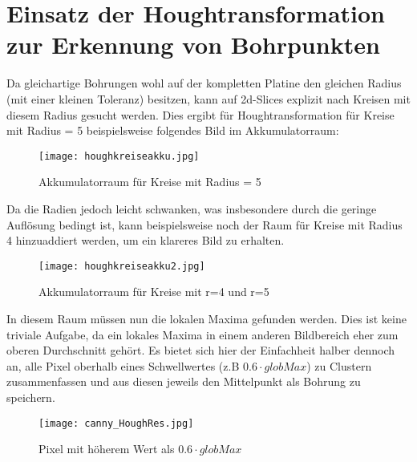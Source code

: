 \section{Einsatz der Houghtransformation zur Erkennung von Bohrpunkten}
Da gleichartige Bohrungen wohl auf der kompletten Platine den gleichen Radius (mit einer kleinen Toleranz) besitzen, kann auf 2d-Slices explizit nach Kreisen mit diesem Radius gesucht werden. Dies ergibt für Houghtransformation für Kreise mit Radius = 5 beispielsweise folgendes Bild im Akkumulatorraum:

\begin{figure}[H]
  \begin{center}
    \texttt{[image: houghkreiseakku.jpg]}
    \caption{Akkumulatorraum für Kreise mit Radius = 5}
    \label{fig:houghkreiseakku}
  \end{center}
\end{figure}

Da die Radien jedoch leicht schwanken, was insbesondere durch die geringe Auflösung bedingt ist, kann beispielsweise noch der Raum für Kreise mit Radius 4 hinzuaddiert werden, um ein klareres Bild zu erhalten. 

\begin{figure}[H]
  \begin{center}
    \texttt{[image: houghkreiseakku2.jpg]}
    \caption{Akkumulatorraum für Kreise mit r=4 und r=5}
    \label{fig:houghkreiseakku2}
  \end{center}
\end{figure}

In diesem Raum müssen nun die lokalen Maxima gefunden werden. Dies ist keine triviale Aufgabe, da ein lokales Maxima in einem anderen Bildbereich eher zum oberen Durchschnitt gehört. Es bietet sich hier der Einfachheit halber dennoch an, alle Pixel oberhalb eines Schwellwertes (z.B $0.6 \cdot globMax$) zu Clustern zusammenfassen und aus diesen jeweils den Mittelpunkt als Bohrung zu speichern. 

\begin{figure}[H]
  \begin{center}
    \texttt{[image: canny\_HoughRes.jpg]}
    \caption{Pixel mit höherem Wert als $0.6 \cdot globMax$}
    \label{fig:houghkreiseakku2}
  \end{center}
\end{figure}

